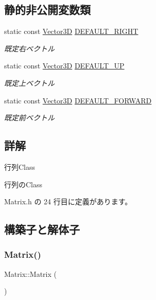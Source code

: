 \subsection*{静的非公開変数類}
\begin{DoxyCompactItemize}
\item 
static const \mbox{\hyperlink{class_vector3_d}{Vector3D}} \mbox{\hyperlink{class_matrix_adacba7656f6f241250c339c062196803}{D\+E\+F\+A\+U\+L\+T\+\_\+\+R\+I\+G\+HT}}
\begin{DoxyCompactList}\small\item\em 既定右ベクトル \end{DoxyCompactList}\item 
static const \mbox{\hyperlink{class_vector3_d}{Vector3D}} \mbox{\hyperlink{class_matrix_a464c6648a8d6a336250e11f9cf8c67bf}{D\+E\+F\+A\+U\+L\+T\+\_\+\+UP}}
\begin{DoxyCompactList}\small\item\em 既定上ベクトル \end{DoxyCompactList}\item 
static const \mbox{\hyperlink{class_vector3_d}{Vector3D}} \mbox{\hyperlink{class_matrix_a0a58999357e3a835da86f223d62ba086}{D\+E\+F\+A\+U\+L\+T\+\_\+\+F\+O\+R\+W\+A\+RD}}
\begin{DoxyCompactList}\small\item\em 既定前ベクトル \end{DoxyCompactList}\end{DoxyCompactItemize}


\subsection{詳解}
行列\+Class 

行列の\+Class 

 Matrix.\+h の 24 行目に定義があります。



\subsection{構築子と解体子}
\mbox{\label{class_matrix_a2dba13c45127354c9f75ef576f49269b}} 
\subsubsection{\texorpdfstring{Matrix()}{Matrix()}\hspace{0.1cm}{\footnotesize\ttfamily [1/5]}}
{\footnotesize\ttfamily Matrix\+::\+Matrix (\begin{DoxyParamCaption}{ }\end{DoxyParamCaption})}



